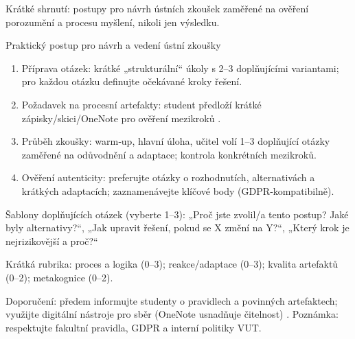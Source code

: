 Krátké shrnutí: postupy pro návrh ústních zkoušek zaměřené na ověření porozumění a procesu myšlení, nikoli jen výsledku.

Praktický postup pro návrh a vedení ústní zkoušky
\begin{enumerate}
  \item Příprava otázek: krátké „strukturální“ úkoly s 2–3 doplňujícími variantami; pro každou otázku definujte očekávané kroky řešení.
  \item Požadavek na procesní artefakty: student předloží krátké zápisky/skici/OneNote pro ověření mezikroků \cite{kb_ai_101_tipu_pdf_04e4a115_page_8_1}.
  \item Průběh zkoušky: warm‑up, hlavní úloha, učitel volí 1–3 doplňující otázky zaměřené na odůvodnění a adaptace; kontrola konkrétních mezikroků.
  \item Ověření autenticity: preferujte otázky o rozhodnutích, alternativách a krátkých adaptacích; zaznamenávejte klíčové body (GDPR‑kompatibilně).
\end{enumerate}

Šablony doplňujících otázek (vyberte 1–3): „Proč jste zvolil/a tento postup? Jaké byly alternativy?“, „Jak upravit řešení, pokud se X změní na Y?“, „Který krok je nejrizikovější a proč?“

Krátká rubrika: proces a logika (0–3); reakce/adaptace (0–3); kvalita artefaktů (0–2); metakognice (0–2).

Doporučení: předem informujte studenty o pravidlech a povinných artefaktech; využijte digitální nástroje pro sběr (OneNote usnadňuje čitelnost) \cite{kb_ai_101_tipu_pdf_04e4a115_page_8_1}. Poznámka: respektujte fakultní pravidla, GDPR a interní politiky VUT.